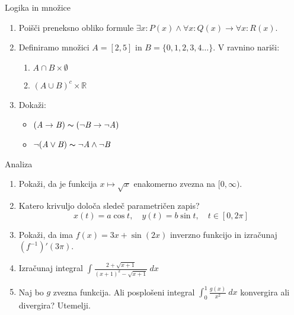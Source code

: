 \begin{frame}{Logika in množice}
	\begin{enumerate}
		\item
		Poišči preneksno obliko formule $ \exists x : \mathit{P}(x) \land \forall x : \mathit{Q}(x) \rightarrow \forall x : \mathit{R} (x) $.
		\item 
		Definiramo množici $ \mathit{A} = [2,5] $ in $ \mathit{B} = \{0,1,2,3,4 \dots\} $.
		V ravnino nariši:
		\begin{enumerate}
		   \item $ \mathit{A} \cap \mathit{B} \times \emptyset $
		   \item $ ( \mathit{A} \cup \mathit{B} )^c \times \mathbb{R} $
		\end{enumerate}
		\item
		Dokaži:
		\begin{itemize}
			\item $ (\mathit{A} \rightarrow \mathit{B} ) \thicksim ( \neg \mathit{B} \rightarrow \neg \mathit{A}) $
			\item $ \neg (\mathit{A} \lor \mathit{B} ) \thicksim \neg \mathit{A} \land \neg \mathit{B}  $
		\end{itemize}
	\end{enumerate}
\end{frame}

\begin{frame}{Analiza}
	\begin{enumerate}
		\item
		Pokaži, da je funkcija $ x \mapsto \sqrt{x} $ enakomerno zvezna na $ [0,\infty) $.
		\item 
		Katero krivuljo določa sledeč parametričen zapis?
		$$
		   x(t) = a \cos t, \quad %
		   y(t) = b \sin t, \quad %
		   t \in [0, 2 \pi]
		$$ 
		\item
		Pokaži, da ima $ f(x) = 3x + \sin(2x) $ inverzno funkcijo in izračunaj $ (f^{-1})' (3\pi) $.
		
		\item
		Izračunaj integral 
		$ \displaystyle \int \frac{2 + \sqrt{x + 1}}{(x + 1)^2 - \sqrt{x+1}} \ dx $
		\item 
		Naj bo $g$ zvezna funkcija. Ali posplošeni integral 
		$ \displaystyle \int_{0}^{1} \frac{g(x)}{x^2} \ dx $
		konvergira ali divergira? Utemelji.
	\end{enumerate}
\end{frame}

